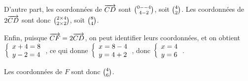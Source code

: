 \documentclass[12pt]{article}
\begin{document}
\begin{exercice}
\begin{enumerate}
\begin{enumerate}
      D'autre part, les coordonnées de $\overrightarrow{CD}$ sont $\binom{0--4}{4-2}$, soit $\binom{4}{2}$. Les coordonnées de $2\overrightarrow{CD}$ sont donc $\binom{2\times4}{2\times2}$, soit $\binom{8}{4}$.

      Enfin, puisque $\overrightarrow{CF}=2\overrightarrow{CD}$, on peut identifier leurs coordonnées, et on obtient $\left\{\begin{array}{l}x+4=8\\y-2=4\end{array}\right.$, ce qui donne $\left\{\begin{array}{l}x=8-4\\y=4+2\end{array}\right.$, donc $\left\{\begin{array}{l}x=4\\y=6\end{array}\right.$.

      Les coordonnées de $F$ sont donc $\binom{4}{6}$.
  \end{enumerate}
  \end{enumerate}
\end{exercice}
\end{document}
